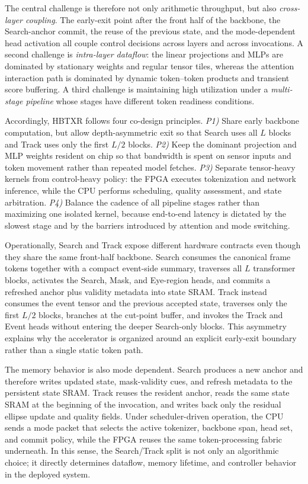 \documentclass[journal]{IEEEtran}
\begin{document}
The central challenge is therefore not only arithmetic throughput, but also \emph{cross-layer coupling}. The early-exit point after the front half of the backbone, the Search-anchor commit, the reuse of the previous state, and the mode-dependent head activation all couple control decisions across layers and across invocations. A second challenge is \emph{intra-layer dataflow}: the linear projections and MLPs are dominated by stationary weights and regular tensor tiles, whereas the attention interaction path is dominated by dynamic token--token products and transient score buffering. A third challenge is maintaining high utilization under a \emph{multi-stage pipeline} whose stages have different token readiness conditions.

Accordingly, HBTXR follows four co-design principles. \emph{P1)} Share early backbone computation, but allow depth-asymmetric exit so that Search uses all $L$ blocks and Track uses only the first $L/2$ blocks. \emph{P2)} Keep the dominant projection and MLP weights resident on chip so that bandwidth is spent on sensor inputs and token movement rather than repeated model fetches. \emph{P3)} Separate tensor-heavy kernels from control-heavy policy: the FPGA executes tokenization and network inference, while the CPU performs scheduling, quality assessment, and state arbitration. \emph{P4)} Balance the cadence of all pipeline stages rather than maximizing one isolated kernel, because end-to-end latency is dictated by the slowest stage and by the barriers introduced by attention and mode switching.


Operationally, Search and Track expose different hardware contracts even though they share the same front-half backbone. Search consumes the canonical frame tokens together with a compact event-side summary, traverses all $L$ transformer blocks, activates the Search, Mask, and Eye-region heads, and commits a refreshed anchor plus validity metadata into state SRAM. Track instead consumes the event tensor and the previous accepted state, traverses only the first $L/2$ blocks, branches at the cut-point buffer, and invokes the Track and Event heads without entering the deeper Search-only blocks. This asymmetry explains why the accelerator is organized around an explicit early-exit boundary rather than a single static token path.

The memory behavior is also mode dependent. Search produces a new anchor and therefore writes updated state, mask-validity cues, and refresh metadata to the persistent state SRAM. Track reuses the resident anchor, reads the same state SRAM at the beginning of the invocation, and writes back only the residual ellipse update and quality fields. Under scheduler-driven operation, the CPU sends a mode packet that selects the active tokenizer, backbone span, head set, and commit policy, while the FPGA reuses the same token-processing fabric underneath. In this sense, the Search/Track split is not only an algorithmic choice; it directly determines dataflow, memory lifetime, and controller behavior in the deployed system.
\end{document}
